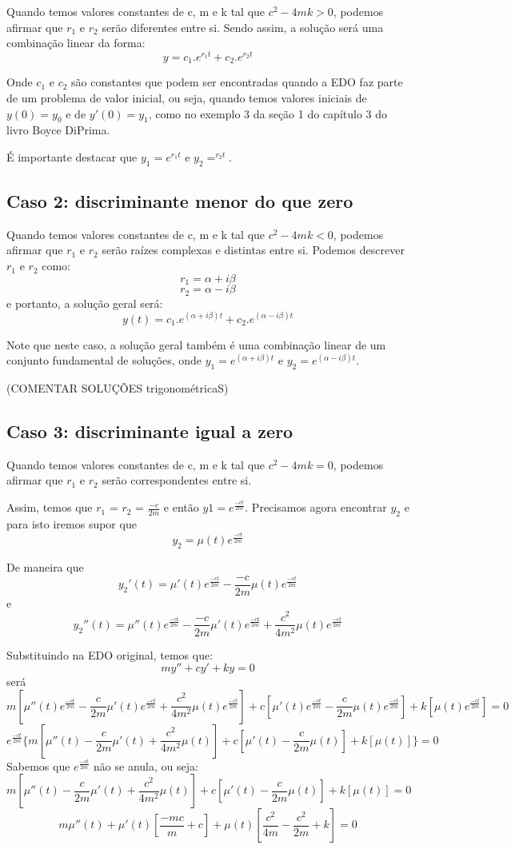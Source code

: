 \documentclass[]{article}
\begin{document}
Quando temos valores constantes de c, m e k tal que $c^2 - 4mk > 0$, podemos afirmar que 
$r_1$ e $r_2$ serão diferentes entre si. Sendo assim, a solução será uma combinação linear da forma:
\[y = c_1.e^{r_1t} + c_2.e^{r_2t}\]

Onde $c_1$ e $c_2$ são constantes que podem ser encontradas quando a EDO faz parte de um problema
de valor inicial, ou seja, quando temos valores iniciais de $y(0)=y_0$ e de $y'(0)=y_1$, como no 
exemplo 3 da seção 1 do capítulo 3 do livro Boyce DiPrima. 

É importante destacar que  $y_1 = e^{r_1t}$ e $y_2 = ^{r_2t}$.

\subsection{Caso 2: discriminante menor do que zero}

Quando temos valores constantes de c, m e k tal que $c^2 - 4mk < 0$, podemos afirmar que 
$r_1$ e $r_2$ serão raízes complexas e distintas entre si. Podemos descrever $r_1$ e $r_2$ como:
\[ r_1 = \alpha + i\beta\] 
\[ r_2 = \alpha - i\beta\] 
e portanto, a solução geral será:
\[ y(t) = c_1.e^{(\alpha + i\beta)t} + c_2.e^{(\alpha - i\beta)t}\]

Note que neste caso, a solução geral também é uma combinação linear de um conjunto fundamental de soluções,
onde $y_1 = e^{(\alpha + i\beta)t}$ e $y_2 = e^{(\alpha - i\beta)t}$.

(COMENTAR SOLUÇÕES trigonométricaS)

\subsection{Caso 3: discriminante igual a zero}

Quando temos valores constantes de c, m e k tal que $c^2 - 4mk = 0$, podemos afirmar que 
$r_1$ e $r_2$ serão correspondentes entre si. 

Assim, temos que $r_1$ = $r_2$ = $\frac{-c}{2m}$ e 
então $y1=e^{\frac{-ct}{2m}}$. Precisamos agora encontrar $y_2$ e para isto iremos supor que 
\[ y_2= \mu (t)e^{\frac{-ct}{2m}}\]

De maneira que
\[y_2'(t) = \mu '(t)e^{\frac{-ct}{2m}} -\frac{-c}{2m}\mu (t)e^{\frac{-ct}{2m}} \] 
e 
\[y_2''(t) = \mu ''(t)e^{\frac{-ct}{2m}} -\frac{-c}{2m}\mu '(t)e^{\frac{-ct}{2m}} + \frac{c^2}{4m^2}\mu (t)e^{\frac{-ct}{2m}}\]

Substituindo na EDO original, temos que:
\[ my'' + cy'  + ky = 0\]
será
\[ m[\mu ''(t)e^{\frac{-ct}{2m}} -\frac{c}{2m}\mu '(t)e^{\frac{-ct}{2m}} + \frac{c^2}{4m^2}\mu (t)e^{\frac{-ct}{2m}}] + c[\mu '(t)e^{\frac{-ct}{2m}} -\frac{c}{2m}\mu (t)e^{\frac{-ct}{2m}}] + k[\mu (t)e^{\frac{-ct}{2m}}] = 0\]
\[ e^{\frac{-ct}{2m}} \{m[\mu ''(t) - \frac{c}{2m}\mu '(t) + \frac{c^2}{4m^2}\mu (t)] + c[\mu '(t) -\frac{c}{2m}\mu (t)] + k[\mu (t)]\} = 0 \]
Sabemos que $e^{\frac{-ct}{2m}}$ não se anula, ou seja: 
\[m[\mu ''(t) - \frac{c}{2m}\mu '(t) + \frac{c^2}{4m^2}\mu (t)] + c[\mu '(t) -\frac{c}{2m}\mu (t)] + k[\mu (t)] = 0\]
\[ m\mu ''(t)  + \mu '(t)[\frac{-mc}{m} + c] + \mu (t) [\frac{c^2}{4m} - \frac{c^2}{2m} + k] = 0\]
\end{document}
